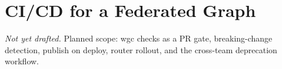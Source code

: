 \chapter{CI/CD for a Federated Graph}
\label{ch:ci-cd-for-a-federated-graph}

\emph{Not yet drafted.} Planned scope: wgc checks as a PR gate, breaking-change detection, publish on deploy, router rollout, and the cross-team deprecation workflow.

% 
